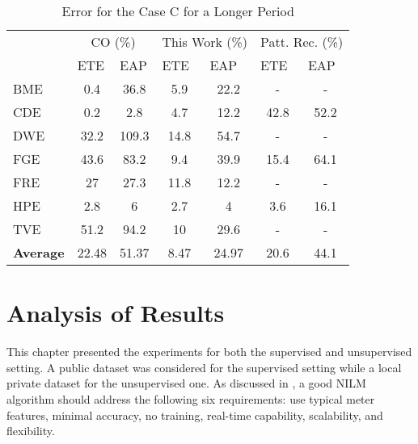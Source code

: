 \begin{table}[tb]
\centering
\caption{Error for the Case C for a Longer Period}
\label{results2}
\begin{tabular}{lcccccc}
\hline
    & \multicolumn{2}{c}{CO (\%)}                            & \multicolumn{2}{c}{This Work (\%)}                    & \multicolumn{2}{c}{Patt. Rec. (\%)}                     \\
    & \multicolumn{1}{l}{ETE} & \multicolumn{1}{l}{EAP} & \multicolumn{1}{l}{ETE} & \multicolumn{1}{l}{EAP} & \multicolumn{1}{l}{ETE} & \multicolumn{1}{l}{EAP} \\ \hline
BME & 0.4                   & 36.8                  & 5.9                   & 22.2                  & -                    & -                    \\
CDE & 0.2                   & 2.8                   & 4.7                   & 12.2                  & 42.8                 & 52.2                   \\
DWE & 32.2                  & 109.3                   & 14.8                  & 54.7                  & -                    & -                    \\
FGE & 43.6                  & 83.2                  & 9.4                   & 39.9                  & 15.4                 & 64.1                   \\
FRE & 27                    & 27.3                  & 11.8                  & 12.2                  & -                    & -                       \\
HPE & 2.8                   & 6                   & 2.7                   & 4                   & 3.6                  & 16.1                   \\ 
TVE & 51.2                  & 94.2                  & 10                    & 29.6                  & -                    & -                    \\ \hline
\textbf{Average} & 22.48     & 51.37                  & 8.47                   & 24.97                  & 20.6                 & 44.1                 \\ \hline
\end{tabular}
\end{table}


\section{Analysis of Results}
This chapter presented the experiments for both the supervised and unsupervised setting. A public dataset was considered for the supervised setting while a local private dataset for the unsupervised one. As discussed in \cite{zeifman_analysis}, a good NILM algorithm should address the following six requirements: use typical meter features, minimal accuracy, no training, real-time capability, scalability, and flexibility.

